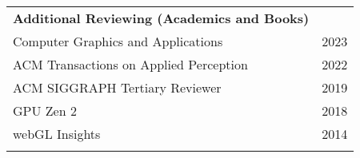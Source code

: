 \begin{tabular*}{7.1in}{@{}l@{\extracolsep\fill}r}
{\bf Additional Reviewing (Academics and Books)} & \\
Computer Graphics and Applications & 2023 \\
ACM Transactions on Applied Perception & 2022 \\
ACM SIGGRAPH Tertiary Reviewer & 2019 \\
GPU Zen 2 & 2018 \\
webGL Insights & 2014 \\
\phantom{yommomma} & \phantom{2002}\\

\end{tabular*}


